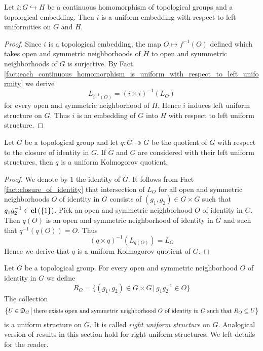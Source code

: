 \documentclass[10pt]{amsart}
\begin{document}
\begin{corollary}\label{corollary:topological_groups_embeddings_is_uniform_embedding}
	Let $i:G\hookrightarrow H$ be a continuous homomorphism of topological groups and a topological embedding. Then $i$ is a uniform embedding with respect to left uniformities on $G$ and $H$.
\end{corollary}
\begin{proof}
	Since $i$ is a topological embedding, the map $O\mapsto f^{-1}(O)$ defined which takes open and symmetric neighborhoods of $H$ to open and syummetric neighborhoods of $G$ is surjective. By Fact \ref{fact:each_continuous_homomorphism_is_uniform_with_respect_to_left_uniformity} we derive
	$$L_{i^{-1}(O)} = \left(i\times i\right)^{-1}(L_O)$$
	for every open and symmetric neighborhood of $H$. Hence $i$ induces left uniform structure on $G$. Thus $i$ is an embedding of $G$ into $H$ with respect to left uniform structure.
\end{proof}

\begin{corollary}\label{corollary:uniform_Kolmogorov_quotients_of_topological_groups}
	Let $G$ be a topological group and let $q:G\twoheadrightarrow \tilde{G}$ be the quotient of $G$ with respect to the closure of identity in $G$. If $\tilde{G}$ and $G$ are considered with their left uniform structures, then $q$ is a uniform Kolmogorov quotient.
\end{corollary}
\begin{proof}
	We denote by $1$ the identity of $G$. It follows from Fact \ref{fact:closure_of_identity} that intersection of $L_O$ for all open and symmetric neighborhoods $O$ of identity in $G$ consists of $(g_1,g_2) \in G\times G$ such that $g_1g_2^{-1} \in \mathbf{cl}\left(\{1\}\right)$. Pick an open and symmetric neighborhood $O$ of identity in $G$. Then $q(O)$ is an open and symmetric neighborhood of identity in $\tilde{G}$ and such that $q^{-1}(q(O)) = O$. Thus
	$$\left(q \times q\right)^{-1}(L_{q(O)}) = L_O$$
	Hence we derive that $q$ is a uniform Kolmogorov quotient of $G$.
\end{proof}

\begin{remark}\label{remark:right_uniform_structure}
	Let $G$ be a topological group. For every open and symmetric neighborhood $O$ of identity in $G$ we define
	$$R_O = \big\{(g_1,g_2)\in G\times G\,\big|\,g_1g_2^{-1} \in O\big\}$$
	The collection
	$$\big\{U \in {\mathfrak D}_G\,\big|\,\mbox{there exists open and symmetric neighborhood }O\mbox{ of identity in }G\mbox{ such that }R_O\subseteq U\big\}$$
	is a uniform structure on $G$. It is called \textit{right uniform structure} on $G$. Analogical version of results in this section hold for right uniform structures. We left details for the reader.
\end{remark}
\end{document}
